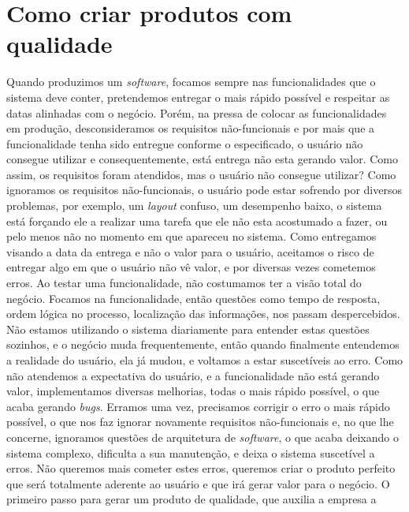   \section{Como criar produtos com qualidade}
    Quando produzimos um \textit{software}, focamos sempre nas funcionalidades que
    o sistema deve conter, pretendemos entregar o mais rápido possível e respeitar
    as datas alinhadas com o negócio. Porém, na pressa de colocar as funcionalidades
    em produção, desconsideramos os requisitos não-funcionais e por mais que a
    funcionalidade tenha sido entregue conforme o especificado, o usuário não
    consegue utilizar e consequentemente, está entrega não esta gerando valor. \newline
    Como assim, os requisitos foram atendidos, mas o usuário não consegue utilizar?
    Como ignoramos os requisitos não-funcionais, o usuário pode estar sofrendo por
    diversos problemas, por exemplo, um \textit{layout} confuso, um desempenho baixo,
    o sistema está forçando ele a realizar uma tarefa que ele não esta acostumado a
    fazer, ou pelo menos não no momento em que apareceu no sistema. Como entregamos
    visando a data da entrega e não o valor para o usuário, aceitamos o risco de
    entregar algo em que o usuário não vê valor, e por diversas vezes cometemos
    erros. Ao testar uma funcionalidade, não costumamos ter a visão total do negócio.
    Focamos na funcionalidade, então questões como tempo de resposta, ordem lógica
    no processo, localização das informações, nos passam despercebidos. Não estamos
    utilizando o sistema diariamente para entender estas questões sozinhos, e o
    negócio muda frequentemente, então quando finalmente entendemos a realidade do
    usuário, ela já mudou, e voltamos a estar suscetíveis ao erro. \newline
    Como não atendemos a expectativa do usuário, e a funcionalidade não está gerando
    valor, implementamos diversas melhorias, todas o mais rápido possível, o que
    acaba gerando \textit{bugs}. Erramos uma vez, precisamos corrigir o erro o mais
    rápido possível, o que nos faz ignorar novamente requisitos não-funcionais e,
    no que lhe concerne, ignoramos questões de arquitetura de \textit{software},
    o que acaba deixando o sistema complexo, dificulta a sua manutenção, e deixa
    o sistema suscetível a erros. \newline
    Não queremos mais cometer estes erros, queremos criar o produto perfeito que
    será totalmente aderente ao usuário e que irá gerar valor para o negócio. O
    primeiro passo para gerar um produto de qualidade, que auxilia a empresa a
